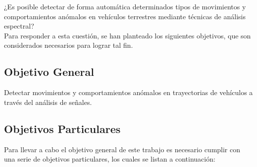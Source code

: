 ¿Es posible detectar de forma automática determinados tipos de movimientos y comportamientos anómalos en vehículos terrestres mediante técnicas de análisis espectral?\\

Para responder a esta cuestión, se han planteado los siguientes objetivos, que son considerados necesarios para lograr tal fin.

\subsection{Objetivo General}

Detectar movimientos y comportamientos anómalos en trayectorias de vehículos a través del análisis de señales.
\subsection{Objetivos Particulares}
Para llevar a cabo el objetivo general de este trabajo es necesario cumplir con una serie de objetivos particulares, los cuales se listan a continuación:

